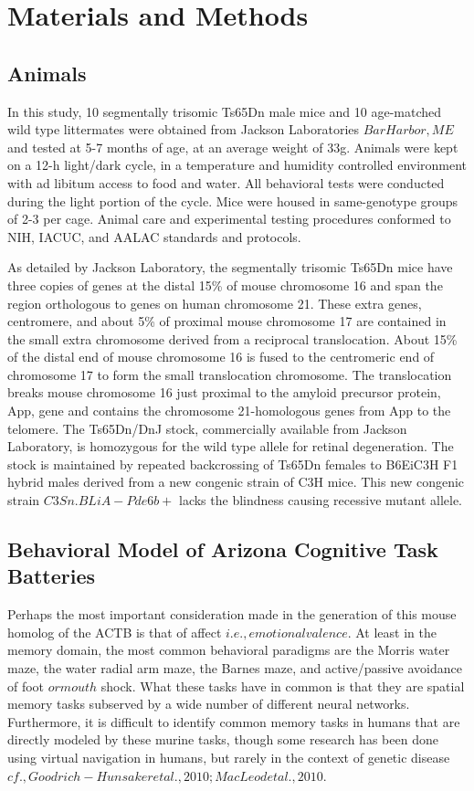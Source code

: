 \documentclass{article}
\begin{document}
\section{Materials and Methods}
\subsection{Animals}
In this study, 10 segmentally trisomic Ts65Dn male mice and 10 age-matched wild type littermates were obtained from Jackson Laboratories \(Bar Harbor, ME\) and tested at 5-7 months of age, at an average weight of 33g. Animals were kept on a 12-h light/dark cycle, in a temperature and humidity controlled environment with ad libitum access to food and water. All behavioral tests were conducted during the light portion of the cycle. Mice were housed in same-genotype groups of 2-3 per cage. Animal care and experimental testing procedures conformed to NIH, IACUC, and AALAC standards and protocols.

As detailed by Jackson Laboratory, the segmentally trisomic Ts65Dn mice have three copies of genes at the distal 15\% of mouse chromosome 16 and span the region orthologous to genes on human chromosome 21. These extra genes, centromere, and about 5\% of proximal mouse chromosome 17 are contained in the small extra chromosome derived from a reciprocal translocation. About 15\% of the distal end of mouse chromosome 16 is fused to the centromeric end of chromosome 17 to form the small translocation chromosome. The translocation breaks mouse chromosome 16 just proximal to the amyloid precursor protein, App, gene and contains the chromosome 21-homologous genes from App to the telomere. The Ts65Dn/DnJ stock, commercially available from Jackson Laboratory, is homozygous for the wild type allele for retinal degeneration. The stock is maintained by repeated backcrossing of Ts65Dn females to B6EiC3H F1 hybrid males derived from a new congenic strain of C3H mice. This new congenic strain \(C3Sn.BLiA-Pde6b+\) lacks the blindness causing recessive mutant allele.

\subsection{Behavioral Model of Arizona Cognitive Task Batteries}
Perhaps the most important consideration made in the generation of this mouse homolog of the ACTB is that of affect \(i.e., emotional valence\). At least in the memory domain, the most common behavioral paradigms are the Morris water maze, the water radial arm maze, the Barnes maze, and active/passive avoidance of foot \(or mouth\) shock. What these tasks have in common is that they are spatial memory tasks subserved by a wide number of different neural networks. Furthermore, it is difficult to identify common memory tasks in humans that are directly modeled by these murine tasks, though some research has been done using virtual navigation in humans, but rarely in the context of genetic disease \(cf., Goodrich-Hunsaker et al., 2010; MacLeod et al., 2010\).
\end{document}
